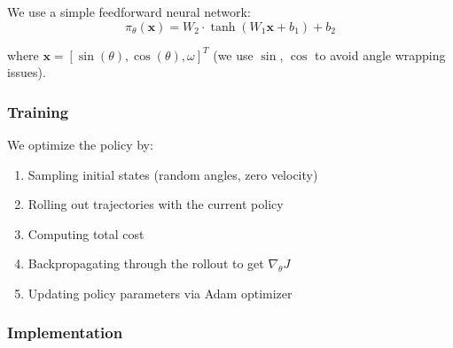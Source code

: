 We use a simple feedforward neural network:
\begin{equation}
\pi_\theta(\mathbf{x}) = W_2 \cdot \tanh(W_1 \mathbf{x} + b_1) + b_2
\end{equation}

where $\mathbf{x} = [\sin(\theta), \cos(\theta), \omega]^T$ (we use $\sin$, $\cos$ to avoid angle wrapping issues).

\subsubsection{Training}

We optimize the policy by:
\begin{enumerate}
    \item Sampling initial states (random angles, zero velocity)
    \item Rolling out trajectories with the current policy
    \item Computing total cost
    \item Backpropagating through the rollout to get $\nabla_\theta J$
    \item Updating policy parameters via Adam optimizer
\end{enumerate}

\subsubsection{Implementation}

